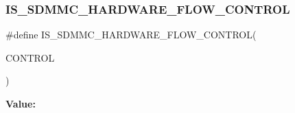 \subsubsection{\texorpdfstring{IS\_SDMMC\_HARDWARE\_FLOW\_CONTROL}{IS\_SDMMC\_HARDWARE\_FLOW\_CONTROL}}
{\footnotesize\ttfamily \#define I\+S\+\_\+\+S\+D\+M\+M\+C\+\_\+\+H\+A\+R\+D\+W\+A\+R\+E\+\_\+\+F\+L\+O\+W\+\_\+\+C\+O\+N\+T\+R\+OL(\begin{DoxyParamCaption}\item[{}]{C\+O\+N\+T\+R\+OL }\end{DoxyParamCaption})}

{\bfseries Value\+:}
\begin{DoxyCode}{0}

\end{DoxyCode}
